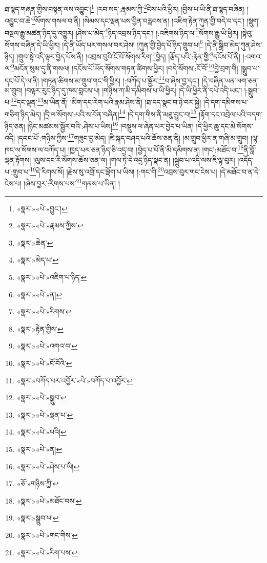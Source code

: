 ཐ་སྙད་གཞན་གྱིས་བསྟན་ལས་འབྱུང་།\footnote{«སྣར་»«པེ་»བྱུང་།} །རབ་སད་:རྣམས་ཀྱི་\footnote{«སྣར་»«པེ་»རྣམས་ཀྱིས་}ངེས་པའི་ཕྱིར། །བྱིས་པ་ཡི་ནི་ཐ་སྙད་བཞིན། །འབྱུང་བ་ཆེ་\footnote{«སྣར་»ཆེན་}སོགས་གསལ་བ་ནི། །སེམས་དང་ལྡན་པས་བྱིན་བརླབས་ན། །འཇིག་རྟེན་ཀུན་གྱི་བདེ་བ་དང་། །སྡུག་བསྔལ་རྒྱུ་མཚན་ཉིད་དུ་འགྱུར། །ཤེས་པ་མེད་\footnote{«སྣར་»མེད་པ་}ཉིད་འབྲས་ཉིད་དང་། །:འཇིགས་ཉིད་ལ་\footnote{«སྣར་»«པེ་»འཇིག་པ་ཉིད་}སོགས་རྒྱུ་ཡི་ཕྱིར། །སྟེའུ་སོགས་བཞིན་དེ་ཡི་ཕྱིར། །དེ་ནི་ཡོད་པར་གསལ་བར་ཤེས། །ཀུན་གྱི་བྱེད་པོ་ཉིད་གྲུབ་པ།\footnote{«སྣར་»«པེ་»ན།} །དེ་ནི་སྒྲིབ་མེད་ཀུན་ཤེས་ཉིད། །གྲུབ་སྟེ་འདི་ལྟར་བྱེད་པོས་ནི། །འབྲས་བུའི་ངོ་བོ་སོགས་རིག་\footnote{«སྣར་»«པེ་»རིགས་}བྱེད། །རྩོད་པའི་:རྟེན་གྱི་\footnote{«སྣར་»རྟེན་གྱིས་}དངོས་པོ་ནི། །:འགའ་ལ་\footnote{«སྣར་»«པེ་»འགའ་བ་}མངོན་སུམ་དུ་ནི་གསལ། །དངོས་པོ་ཡོད་སོགས་གཏན་ཚིགས་ཕྱིར། །བདེ་སོགས་:ངོ་བོ་\footnote{«སྣར་»«པེ་»ངོ་བོའི་}བྱེ་བྲག་གི། །སྒྲུབ་པ་དང་པོ་དེ་ལ་ནི། །གཏན་ཚིགས་མ་གྲུབ་གང་གི་ཕྱིར། །:བཀོད་པ་སྦྱོར་\footnote{«སྣར་»བཀོད་པར་འབྱོར་«པེ་»བཀོད་པ་འབྱོར་}བ་ཞེས་བྱ་དང་། །དེ་བཞིན་ཡན་ལག་ཅན་མ་གྲུབ། །བལྟར་རུང་ཉིད་དུ་ཁས་བླངས་པ། །གཉིས་ཀ་མི་དམིགས་པ་ཡི་ཕྱིར། །དེ་ཡི་ཕྱིར་ནི་དཔེ་འདི་ཡང་། །:སྒྲུབ་པ་\footnote{«སྣར་»«པེ་»སྒྲུབ་}དང་ལྡན་\footnote{«སྣར་»«པེ་»ལྡན་པ་}མ་ཡིན་ནོ། །མིག་དང་རེག་པའི་རྣམ་ཤེས་ནི། །ཐ་དད་སྣང་བ་ཉེ་བར་སྐྱེ། །དེ་དག་དམིགས་པ་གཅིག་ཉིད་མེད། །དྲི་ལ་སོགས་:པའི་ས་བོན་བཞིན།\footnote{«སྣར་»«པེ་»པའི།} །དེ་དག་གིས་ནི་མཐུ་བྱུང་བ།\footnote{«སྣར་»«པེ་»ན།} །རྟོག་དང་འབྲེལ་པའི་བདག་ཉིད་ཅན། །ཉིང་མཚམས་སྦྱོར་བའི་:ཤེས་པ་ཡིས།\footnote{«སྣར་»«པེ་»ཤེས་པ་ཡི།} །བསྡུས་ལ་ཞེན་པར་བྱེད་པ་ཡིན། །དེ་ཕྱིར་ཆུ་དང་མེ་སོགས་འདི། །དབང་པོ་:གཉིས་ཀྱིས་\footnote{«ཅོ་»གཉིས་ཀྱི་}གཟུང་བྱ་མེད། །ཇི་སྐད་བཤད་པའི་ཆོས་ཅན་ནི། །མ་གྲུབ་ཕྱིར་ན་གཞི་མ་གྲུབ། །ལྷ་ཁང་ལ་སོགས་ལ་བཀོད་པ། །ཁྱད་པར་ཅན་ཉིད་ཅི་འདྲ་བ། །བྱེད་པ་པོ་ནི་མི་དམིགས་ན། །གང་:མཐོང་བ་\footnote{«སྣར་»«པེ་»མཐོང་བས་}ནི་བློ་ལྡན་རྟོགས། །ལུས་དང་རི་སོགས་ཆོས་ཅན་ལ། །གལ་ཏེ་དེ་འདྲ་ཉིད་སྣང་ན། །སྒྲུབ་པ་འདི་ལས་ཇི་ལྟ་བུར། །འདོད་པ་:གྲུབ་པ་\footnote{«སྣར་»སྒྲུབ་པ་}དེ་རིགས་སོ། །རྗེས་སུ་འགྲོ་དང་ལྡོག་པ་ཡིས། །:གང་གི་\footnote{«སྣར་»«པེ་»གང་གིས་}འབྲས་བུར་གང་ངེས་པ། །དེ་མཐོང་བ་ན་དེ་ངེས་པ། །ཞེས་བྱར་:རིགས་པས་\footnote{«སྣར་»«པེ་»རིག་པས་}གནས་པ་ཡིན། །

